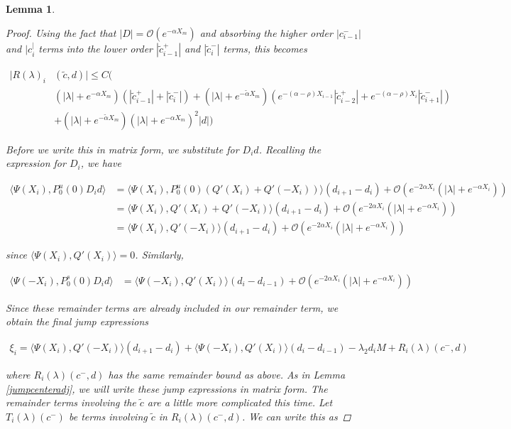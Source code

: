 \documentclass[12pt]{article}
\newtheorem{lemma}{Lemma}
\begin{document}
\begin{lemma}
\begin{proof}
Using the fact that $|D| = \mathcal{O}(e^{-\alpha X_m})$ and absorbing the higher order $|c_{i-1}^-|$ and $|c_i^|$ terms into the lower order $|\tilde{c}_{i-1}^+|$ and $|\tilde{c}_{i}^-|$ terms, this becomes

\begin{align*}
|R(\lambda)_i&(\tilde{c}, d)| \leq C \Big( \\
&(|\lambda| + e^{-\alpha X_m})(|\tilde{c}_{i-1}^+| + |\tilde{c}_{i}^-|) + (|\lambda| + e^{-\tilde{\alpha} X_m})( e^{-(\alpha - \rho) X_{i-1}}|\tilde{c}_{i-2}^+| + e^{-(\alpha - \rho) X_i}|\tilde{c}_{i+1}^-|) \\
&+ (|\lambda| + e^{-\tilde{\alpha} X_m})(|\lambda| + e^{-\alpha X_m})^2 |d| \Big)
\end{align*}

Before we write this in matrix form, we substitute for $D_i d$. Recalling the expression for $D_i$, we have

\begin{align*}
\langle \Psi(X_i), P_0^u(0) D_i d \rangle
&= \langle \Psi(X_i), P_0^u(0) (Q'(X_i) + Q'(-X_i)) \rangle (d_{i+1} - d_i)
+\mathcal{O}(e^{-2 \alpha X_i}(|\lambda| + e^{-\alpha X_i})) \\
&= \langle \Psi(X_i), Q'(X_i) + Q'(-X_i) \rangle (d_{i+1} - d_i)
+\mathcal{O}(e^{-2 \alpha X_i}(|\lambda| + e^{-\alpha X_i})) \\
&= \langle \Psi(X_i), Q'(-X_i) \rangle (d_{i+1} - d_i)
+\mathcal{O}(e^{-2 \alpha X_i}(|\lambda| + e^{-\alpha X_i})) 
\end{align*}

since $\langle \Psi(X_i), Q'(X_i) \rangle = 0$. Similarly, 

\begin{align*}
\langle \Psi(-X_i), P_0^s(0) D_i d \rangle
&= \langle \Psi(-X_i), Q'(X_i) \rangle (d_i - d_{i-1})
+\mathcal{O}(e^{-2 \alpha X_i}(|\lambda| + e^{-\alpha X_i})) 
\end{align*}

Since these remainder terms are already included in our remainder term, we obtain the final jump expressions

\begin{align*}
\xi_i = \langle \Psi(X_i), Q'(-X_i) \rangle (d_{i+1} - d_i)
+ \langle \Psi(-X_i), Q'(X_i) \rangle (d_i - d_{i-1})
- \lambda_2 d_i M + R_i(\lambda)(c^-, d)
\end{align*}

where $R_i(\lambda)(c^-, d)$ has the same remainder bound as above. As in Lemma \ref{jumpcenteradj}, we will write these jump expressions in matrix form. The remainder terms involving the $\tilde{c}$ are a little more complicated this time. Let $T_i(\lambda)(c^-)$ be terms involving $\tilde{c}$ in $R_i(\lambda)(c^-, d)$. We can write this as


\end{proof}
\end{lemma}
\end{document}
